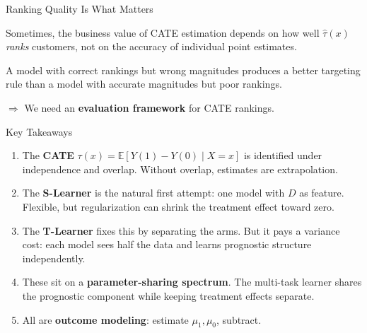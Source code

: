 \documentclass[aspectratio=169, 11pt]{beamer}
\newcommand{\E}{\mathbb{E}}
\begin{document}
\begin{frame}{Ranking Quality Is What Matters}
 
Sometimes, the business value of CATE estimation depends on how well $\hat{\tau}(x)$ \emph{ranks} customers, not on the accuracy of individual point estimates.
 
\bigskip
 
A model with correct rankings but wrong magnitudes produces a better targeting rule than a model with accurate magnitudes but poor rankings.
 
\bigskip
 
$\Rightarrow$ We need an \textbf{evaluation framework} for CATE rankings.
 
\end{frame}
 
\begin{frame}{Key Takeaways}
 
\begin{enumerate}
    \item The \textbf{CATE} $\tau(x) = \E[Y(1) - Y(0) \mid X = x]$ is identified under independence and overlap. Without overlap, estimates are extrapolation.
 
    \medskip
 
    \item The \textbf{S-Learner} is the natural first attempt: one model with $D$ as feature. Flexible, but regularization can shrink the treatment effect toward zero.
 
    \medskip
 
    \item The \textbf{T-Learner} fixes this by separating the arms. But it pays a variance cost: each model sees half the data and learns prognostic structure independently.
 
    \medskip
 
    \item These sit on a \textbf{parameter-sharing spectrum}. The multi-task learner shares the prognostic component while keeping treatment effects separate.
 
    \medskip
 
    \item All are \textbf{outcome modeling}: estimate $\mu_1, \mu_0$, subtract.
 
\end{enumerate}
\end{frame}
\end{document}
